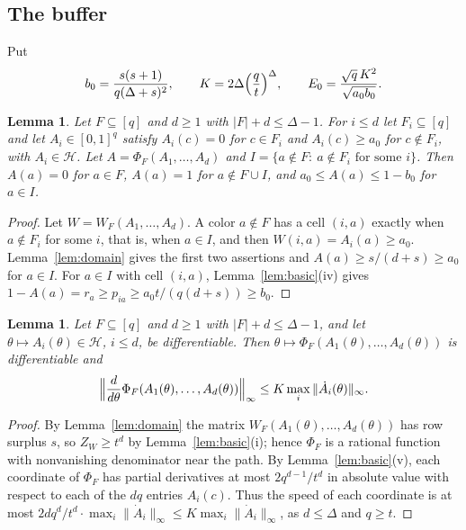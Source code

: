 \documentclass{amsart}
\numberwithin{equation}{section}
\theoremstyle{plain}
\newtheorem{lemma}[theorem]{Lemma}
\theoremstyle{definition}
\theoremstyle{remark}
\newcommand{\cH}{\mathcal{H}}
\begin{document}
\subsection{The buffer}
Put
\[
b_0=\frac{s(s+1)}{q(\Delta+s)^2},\qquad K=2\Delta\Bigl(\frac{q}{t}\Bigr)^{\Delta},\qquad E_0=\frac{\sqrt q\,K^2}{\sqrt{a_0b_0}} .
\]

\begin{lemma}\label{lem:buffer}
Let $F\subseteq[q]$ and $d\ge1$ with $|F|+d\le\Delta-1$. For $i\le d$ let $F_i\subseteq[q]$ and let $A_i\in[0,1]^q$ satisfy $A_i(c)=0$ for $c\in F_i$ and $A_i(c)\ge a_0$ for $c\notin F_i$, with $A_i\in\cH$. Let $A=\Phi_F(A_1,\dots,A_d)$ and $I=\{a\notin F:\ a\notin F_i\text{ for some }i\}$. Then $A(a)=0$ for $a\in F$, $A(a)=1$ for $a\notin F\cup I$, and $a_0\le A(a)\le1-b_0$ for $a\in I$.
\end{lemma}

\begin{proof}
Let $W=W_F(A_1,\dots,A_d)$. A color $a\notin F$ has a cell $(i,a)$ exactly when $a\notin F_i$ for some $i$, that is, when $a\in I$, and then $W(i,a)=A_i(a)\ge a_0$. Lemma~\ref{lem:domain} gives the first two assertions and $A(a)\ge s/(d+s)\ge a_0$ for $a\in I$. For $a\in I$ with cell $(i,a)$, Lemma~\ref{lem:basic}(iv) gives $1-A(a)=r_a\ge p_{ia}\ge a_0t/(q(d+s))\ge b_0$.
\end{proof}

\begin{lemma}\label{lem:speed}
Let $F\subseteq[q]$ and $d\ge1$ with $|F|+d\le\Delta-1$, and let $\theta\mapsto A_i(\theta)\in\cH$, $i\le d$, be differentiable. Then $\theta\mapsto\Phi_F(A_1(\theta),\dots,A_d(\theta))$ is differentiable and
\[
\Bigl\|\frac{d}{d\theta}\Phi_F(A_1(\theta),\dots,A_d(\theta))\Bigr\|_\infty\le K\max_i\|\dot A_i(\theta)\|_\infty .
\]
\end{lemma}

\begin{proof}
By Lemma~\ref{lem:domain} the matrix $W_F(A_1(\theta),\dots,A_d(\theta))$ has row surplus $s$, so $Z_W\ge t^d$ by Lemma~\ref{lem:basic}(i); hence $\Phi_F$ is a rational function with nonvanishing denominator near the path. By Lemma~\ref{lem:basic}(v), each coordinate of $\Phi_F$ has partial derivatives at most $2q^{d-1}/t^d$ in absolute value with respect to each of the $dq$ entries $A_i(c)$. Thus the speed of each coordinate is at most $2dq^d/t^d\cdot\max_i\|\dot A_i\|_\infty\le K\max_i\|\dot A_i\|_\infty$, as $d\le\Delta$ and $q\ge t$.
\end{proof}
\end{document}
